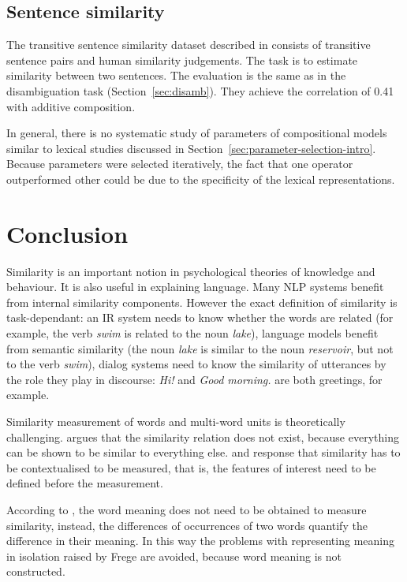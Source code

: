 \subsection{Sentence similarity}
\label{sec:sentence-similarity}

The transitive sentence similarity dataset described in  consists of transitive sentence pairs and human similarity judgements. The task is to estimate similarity between two sentences. The evaluation is the same as in the disambiguation task (Section~\ref{sec:disamb}). They achieve the correlation of 0.41 with additive composition.

In general, there is no systematic study of parameters of compositional models similar to lexical studies discussed in Section~\ref{sec:parameter-selection-intro}. Because parameters were selected iteratively, the fact that one operator outperformed other could be due to the specificity of the lexical representations.

\section{Conclusion}
\label{sec:conclusion-comp}

Similarity is an important notion in psychological theories of knowledge and behaviour. It is also useful in explaining language. Many NLP systems benefit from internal similarity components. However the exact definition of similarity is task-dependant: an IR system needs to know whether the words are related (for example, the verb \textit{swim} is related to the noun \textit{lake}), language models benefit from semantic similarity (the noun \textit{lake} is similar to the noun \textit{reservoir}, but not to the verb \textit{swim}), dialog systems need to know the similarity of utterances by the role they play in  discourse: \textit{Hi!} and \textit{Good morning.} are both greetings, for example.

Similarity measurement of words and multi-word units is theoretically challenging.  argues that the similarity relation does not exist, because everything can be shown to be similar to everything else.  and  response that similarity has to be contextualised to be measured, that is, the features of interest need to be defined before the measurement.

According to , the word meaning does not need to be obtained to measure similarity, instead, the differences of occurrences of two words quantify the difference in their meaning. In this way the problems with representing meaning in isolation raised by Frege are avoided, because word meaning is not constructed.

